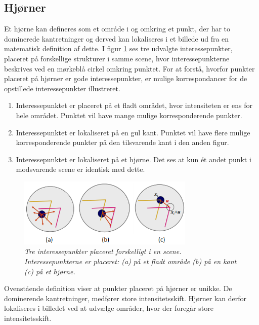 \subsection*{Hjørner}\label{subsec:corner}
Et hjørne kan defineres som et område i og omkring et punkt, der har to dominerede kantretninger og derved kan lokaliseres i et billede ud fra en matematisk definition af dette. I figur \ref{app} ses tre udvalgte interessepunkter, placeret på forskellige strukturer i samme scene, hvor interessepunkterne beskrives ved en mørkeblå cirkel omkring punktet. For at forstå, hvorfor punkter placeret på hjørner er gode interessepunkter, er mulige korrespondancer for de opstillede interessepunkter illustreret.
\begin{enumerate}[label=\alph*]
\item{Interessepunktet er placeret på et fladt området, hvor intensiteten er ens for hele området. Punktet vil have mange mulige korresponderende punkter.}
\item{Interessepunktet er lokaliseret på en gul kant. Punktet vil have flere mulige korresponderende punkter på den tilsvarende kant i den anden figur.}
\item{Interessepunktet er lokaliseret på et hjørne. Det ses at kun ét andet punkt i modsvarende scene er identisk med dette.}
\end{enumerate}
\begin{figure}[H]
    \centering
    \includegraphics[width=0.75\textwidth]{fig/37.png}
    \vspace{-1em}   
    \begin{center}    
    \caption{{\footnotesize \textit{Tre interessepunkter placeret forskelligt i en scene. Interessepunkterne er placeret: (a) på et fladt område (b) på en kant (c) på et hjørne. 
 }}}
    \label{app}
     \end{center}
    \vspace{-2.7em}  
  \end{figure}  
\noindent
Ovenstående definition viser at punkter placeret på hjørner er unikke. De dominerende kantretninger, medfører store intensitetsskift. Hjørner kan derfor lokaliseres i billedet ved at udvælge områder, hvor der foregår store intensitetsskift.
